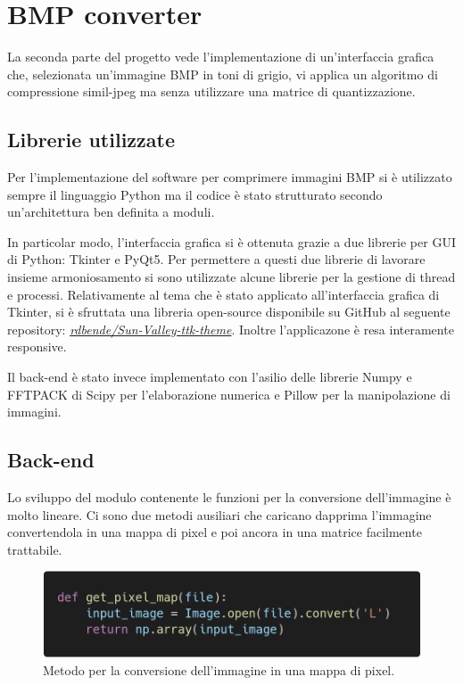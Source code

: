 \documentclass[12pt]{article}
\begin{document}
\section{BMP converter}

La seconda parte del progetto vede l'implementazione di un'interfaccia grafica che, selezionata un'immagine BMP in toni di grigio, vi applica un algoritmo di compressione simil-jpeg ma senza utilizzare una matrice di quantizzazione.

\subsection{Librerie utilizzate}

Per l'implementazione del software per comprimere immagini BMP si è utilizzato sempre il linguaggio Python ma il codice è stato strutturato secondo un'architettura ben definita a moduli.

In particolar modo, l'interfaccia grafica si è ottenuta grazie a due librerie per GUI di Python: Tkinter e PyQt5. Per permettere a questi due librerie di lavorare insieme armoniosamento si sono utilizzate alcune librerie per la gestione di thread e processi. Relativamente al tema che è stato applicato all'interfaccia grafica di Tkinter, si è sfruttata una libreria open-source disponibile su GitHub al seguente repository: \href{https://github.com/rdbende/Sun-Valley-ttk-theme}{\textit{rdbende/Sun-Valley-ttk-theme}}. Inoltre l'applicazone è resa interamente responsive.

Il back-end è stato invece implementato con l'asilio delle librerie Numpy e FFTPACK di Scipy per l'elaborazione numerica e Pillow per la manipolazione di immagini.

\subsection{Back-end}

Lo sviluppo del modulo contenente le funzioni per la conversione dell'immagine è molto lineare.
Ci sono due metodi ausiliari che caricano dapprima l'immagine convertendola in una mappa di pixel e poi ancora in una matrice facilmente trattabile.

\begin{figure}[!ht]
    \begin{center}
    \includegraphics[scale=0.3]{images/code_get_pixel_map.png}
    \caption{Metodo per la conversione dell'immagine in una mappa di pixel.}
    \end{center}
\end{figure}
\end{document}
